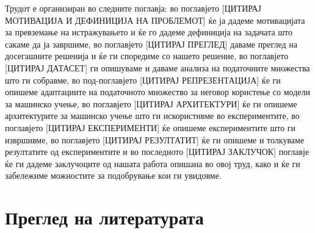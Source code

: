 Трудот е организиран во следните поглавја: во поглавјето [ЦИТИРАЈ МОТИВАЦИЈА И ДЕФИНИЦИЈА НА ПРОБЛЕМОТ] ќе ја дадеме мотивацијата за превземање на истражувањето и ќе го дадеме дефиниција на задачата што сакаме да ја завршиме, во поглавјето [ЦИТИРАЈ ПРЕГЛЕД] даваме преглед на досегашните решенија и ќе ги споредиме со нашето решение, во поглавјето [ЦИТИРАЈ ДАТАСЕТ] ги опишуваме и даваме анализа на податочните множества што ги собравме, во под-поглавјето [ЦИТИРАЈ РЕПРЕЗЕНТАЦИЈА] ќе ги опишеме адаптациите на податочното множество за неговор користење со модели за машинско учење, во поглавјето [ЦИТИРАЈ АРХИТЕКТУРИ] ќе ги опишеме архитектурите за машинско учење што ги искористивме во експериментите, во поглавјето [ЦИТИРАЈ ЕКСПЕРИМЕНТИ] ќе опишеме експериментите што ги извршивме, во поглавјето [ЦИТИРАЈ РЕЗУЛТАТИТ] ќе ги опишеме и толкуваме резултатите од експериментите и во последното [ЦИТИРАЈ ЗАКЛУЧОК] поглавје ќе ги дадеме заклучоците од нашата работа опишана во овој труд, како и ќе ги забележиме можностите за подобрување кои ги увидовме.

\chapter{Преглед на литературата}

